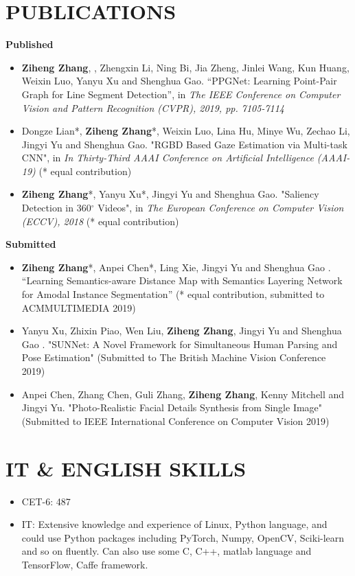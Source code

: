 \documentclass[11pt,a4paper,palatine]{moderncv}        %
\begin{document}
\begin{CJK*}{UTF8}{gbsn}
\section{PUBLICATIONS}
\textbf{Published}
  {\begin{itemize}
    \item  \textbf{Ziheng Zhang}, , Zhengxin Li, Ning Bi, Jia Zheng, Jinlei Wang, Kun Huang, Weixin Luo, Yanyu Xu and Shenghua Gao. “PPGNet: Learning Point-Pair Graph for Line Segment Detection”, in \textit{The IEEE Conference on Computer Vision and Pattern Recognition (CVPR), 2019, pp. 7105-7114}
    \item Dongze Lian*, \textbf{Ziheng Zhang}*, Weixin Luo, Lina Hu, Minye Wu, Zechao Li, Jingyi Yu and Shenghua Gao. "RGBD Based Gaze Estimation via Multi-task CNN", in \textit{In Thirty-Third AAAI Conference on Artificial Intelligence (AAAI-19)} (* equal contribution)
    \item \textbf{Ziheng Zhang}*, Yanyu Xu*, Jingyi Yu and Shenghua Gao. "Saliency Detection in 360$^\circ$ Videos", in \textit{The European Conference on Computer Vision (ECCV), 2018} (* equal contribution)
  \end{itemize}
  }
\textbf{Submitted}
  {\begin{itemize}
    \item  \textbf{Ziheng Zhang}*, Anpei Chen*, Ling Xie, Jingyi Yu and Shenghua Gao . “Learning Semantics-aware Distance Map with Semantics Layering Network for Amodal Instance Segmentation” (* equal contribution, submitted to ACMMULTIMEDIA 2019)
    \item Yanyu Xu, Zhixin Piao, Wen Liu, \textbf{Ziheng Zhang}, Jingyi Yu and Shenghua Gao . "SUNNet: A Novel Framework for Simultaneous Human Parsing and Pose Estimation" (Submitted to The British Machine Vision Conference 2019)
    \item Anpei Chen, Zhang Chen, Guli Zhang, \textbf{Ziheng Zhang}, Kenny Mitchell and Jingyi Yu. "Photo-Realistic Facial Details Synthesis from Single Image" (Submitted to IEEE International Conference on Computer Vision 2019)
  \end{itemize}
  }

\section{IT \& ENGLISH SKILLS}
    \begin{itemize}
        \item CET-6: 487
        \item IT: Extensive knowledge and experience of Linux, Python language, and could use Python packages including PyTorch, Numpy, OpenCV, Sciki-learn and so on fluently. Can also use some C, C++, matlab language and TensorFlow, Caffe framework.
    \end{itemize}


\end{CJK*}
\end{document}
